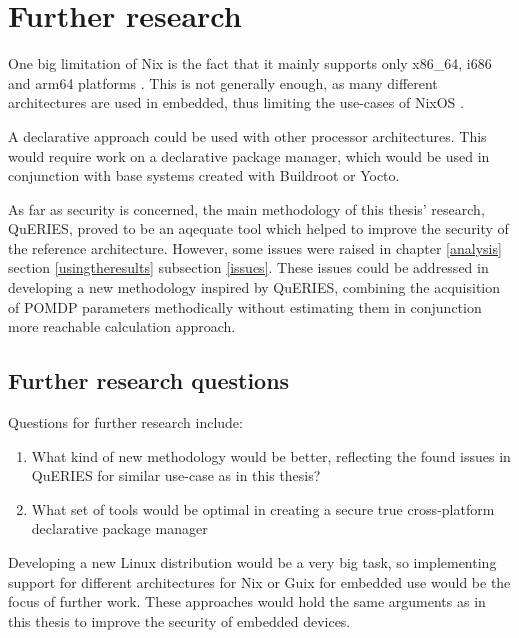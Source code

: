 \chapter{Further research} \label{further}

One big limitation of Nix is the fact that it mainly supports only
x86\_64, i686 and arm64 platforms \cite{nixosNixOSManual}. This is not
generally enough, as many different architectures are used in
embedded, thus limiting the use-cases of
NixOS \cite{fysarakis2014embedded}.

A declarative approach could be used with other processor
architectures. This would require work on a declarative package
manager, which would be used in conjunction with base systems created
with Buildroot or Yocto.

As far as security is concerned, the main methodology of this thesis'
research, QuERIES, proved to be an aqequate tool which helped to
improve the security of the reference architecture. However, some
issues were raised in chapter \ref{analysis} section
\ref{usingtheresults} subsection \ref{issues}. These issues could be
addressed in developing a new methodology inspired by QuERIES,
combining the acquisition of POMDP parameters methodically without estimating them
in conjunction more reachable calculation approach.

\section{Further research questions}

Questions for further research include:
\begin{enumerate}
  \item{What kind of new methodology would be better, reflecting
    the found issues in QuERIES for similar use-case as in this
    thesis?}
  \item What set of tools would be optimal in creating a secure true
    cross-platform declarative package manager 
    
\end{enumerate}

Developing a new Linux distribution would be a very big task, so
implementing support for different architectures for Nix or Guix for
embedded use would be the focus of further work. These approaches
would hold the same arguments as in this thesis to improve the
security of embedded devices.

